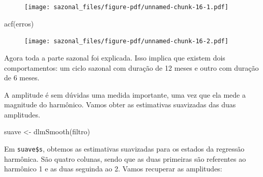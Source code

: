 \documentclass[
  letterpaper,
  DIV=11,
  numbers=noendperiod]{scrreprt}
\newenvironment{Shaded}{\begin{snugshade}}{\end{snugshade}}
\newcommand{\AttributeTok}[1]{\textcolor[rgb]{0.40,0.45,0.13}{#1}}
\newcommand{\DecValTok}[1]{\textcolor[rgb]{0.68,0.00,0.00}{#1}}
\newcommand{\FunctionTok}[1]{\textcolor[rgb]{0.28,0.35,0.67}{#1}}
\newcommand{\NormalTok}[1]{\textcolor[rgb]{0.00,0.23,0.31}{#1}}
\newcommand{\OtherTok}[1]{\textcolor[rgb]{0.00,0.23,0.31}{#1}}
\newcommand{\SpecialCharTok}[1]{\textcolor[rgb]{0.37,0.37,0.37}{#1}}
\begin{document}
\begin{figure}[H]

{\centering \texttt{[image: sazonal\_files/figure-pdf/unnamed-chunk-16-1.pdf]}

}

\end{figure}

\begin{Shaded}
\begin{Highlighting}[]
\FunctionTok{acf}\NormalTok{(erros)}
\end{Highlighting}
\end{Shaded}

\begin{figure}[H]

{\centering \texttt{[image: sazonal\_files/figure-pdf/unnamed-chunk-16-2.pdf]}

}

\end{figure}

Agora toda a parte sazonal foi explicada. Isso implica que existem dois
comportamentos: um ciclo sazonal com duração de 12 meses e outro com
duração de 6 meses.

A amplitude é sem dúvidas uma medida importante, uma vez que ela mede a
magnitude do harmônico. Vamos obter as estimativas suavizadas das duas
amplitudes.

\begin{Shaded}
\begin{Highlighting}[]
\NormalTok{suave }\OtherTok{\textless{}{-}} \FunctionTok{dlmSmooth}\NormalTok{(filtro)}
\end{Highlighting}
\end{Shaded}

Em \texttt{suave\$s}, obtemos as estimativas suavizadas para os estados
da regressão harmônica. São quatro colunas, sendo que as duas primeiras
são referentes ao harmônico 1 e as duas seguinda ao 2. Vamos recuperar
as amplitudes:

\begin{Shaded}
\end{Shaded}
\end{document}
